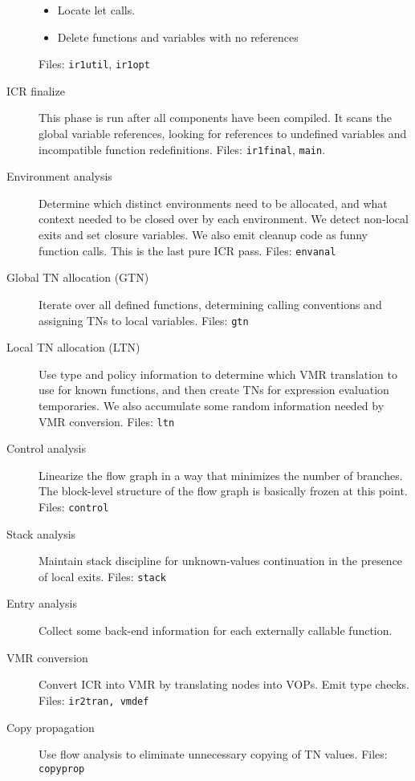 \begin{description}
\begin{itemize}
\item Locate let calls.

\item Delete functions and variables with no references
\end{itemize}
Files: {\tt ir1util}, {\tt ir1opt}

\item[ICR finalize]
This phase is run after all components have been compiled.  It scans the
global variable references, looking for references to undefined variables
and incompatible function redefinitions.  Files: {\tt ir1final}, {\tt main}.

\item[Environment analysis]
Determine which distinct environments need to be allocated, and what
context needed to be closed over by each environment.  We detect non-local
exits and set closure variables.  We also emit cleanup code as funny
function calls.  This is the last pure ICR pass.  Files: {\tt envanal}

\item[Global TN allocation (GTN)]
Iterate over all defined functions, determining calling conventions
and assigning TNs to local variables.  Files: {\tt gtn}

\item[Local TN allocation (LTN)]
Use type and policy information to determine which VMR translation to use
for known functions, and then create TNs for expression evaluation
temporaries.  We also accumulate some random information needed by VMR
conversion.  Files: {\tt ltn}

\item[Control analysis]
Linearize the flow graph in a way that minimizes the number of branches.  The
block-level structure of the flow graph is basically frozen at this point.
Files: {\tt control}

\item[Stack analysis]
Maintain stack discipline for unknown-values continuation in the presence
of local exits.  Files: {\tt stack}

\item[Entry analysis]
Collect some back-end information for each externally callable function.

\item[VMR conversion] Convert ICR into VMR by translating nodes into VOPs.
Emit type checks.  Files: {\tt ir2tran, vmdef}

\item[Copy propagation] Use flow analysis to eliminate unnecessary copying of
TN values.  Files: {\tt copyprop}


\end{description}
